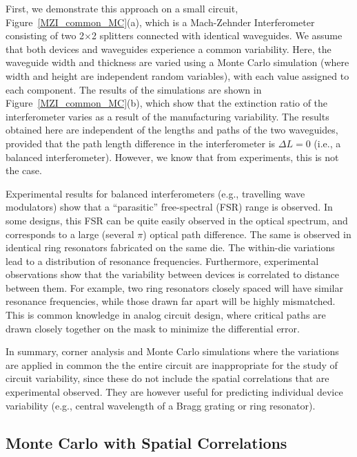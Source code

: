 \documentclass[journal]{spie}
\begin{document}
First, we demonstrate this approach on a small circuit, Figure~\ref{MZI_common_MC}(a), which is a Mach-Zehnder Interferometer consisting of two 2$\times$2 splitters connected with identical waveguides.  We assume that both devices and waveguides experience a common variability.  Here, the waveguide width and thickness are varied using a Monte Carlo simulation (where width and height are independent random variables), with each value assigned to each component.  The results of the simulations are shown in  Figure~\ref{MZI_common_MC}(b), which show that the extinction ratio of the interferometer varies as a result of the manufacturing variability.  The results obtained here are independent of the lengths and paths of the two waveguides, provided that the path length difference in the interferometer is $\Delta L = 0$ (i.e., a balanced interferometer). However, we know that from experiments, this is not the case.  

Experimental results for balanced interferometers (e.g., travelling wave modulators) show that a ``parasitic'' free-spectral (FSR) range is observed.  In some designs, this FSR can be quite easily observed in the optical spectrum, and corresponds to a large (several $\pi$) optical path difference.  The same is observed in identical ring resonators fabricated on the same die.  The within-die variations lead to a distribution of resonance frequencies.  Furthermore, experimental observations show that the variability between devices is correlated to distance between them.  For example, two ring resonators closely spaced will have similar resonance frequencies, while those drawn far apart will be highly mismatched.  This is common knowledge in analog circuit design, where critical paths are drawn closely together on the mask to minimize the differential error. 

In summary, corner analysis and Monte Carlo simulations where the variations are applied in common the the entire circuit are inappropriate for the study of circuit variability, since these do not include the spatial correlations that are experimental observed.  They are however useful for predicting individual device variability (e.g., central wavelength of a Bragg grating or ring resonator).


\subsection{Monte Carlo with Spatial Correlations}
\end{document}
